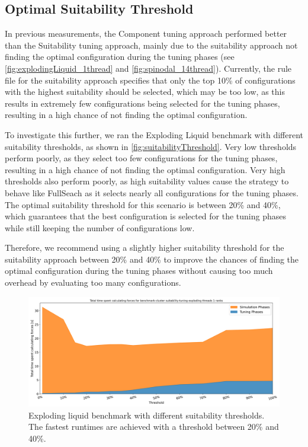 \subsection{Optimal Suitability Threshold}
\label{sec:suitabilityThreshold}

In previous measurements, the Component tuning approach performed better than the Suitability tuning approach, mainly due to the suitability approach not finding the optimal configuration during the tuning phases (see \autoref{fig:explodingLiquid_1thread} and \autoref{fig:spinodal_14thread}).
Currently, the rule file for the suitability approach specifies that only the top 10\% of configurations with the highest suitability should be selected, which may be too low, as this results in extremely few configurations being selected for the tuning phases, resulting in a high chance of not finding the optimal configuration.

To investigate this further, we ran the Exploding Liquid benchmark with different suitability thresholds, as shown in \autoref{fig:suitabilityThreshold}. Very low thresholds perform poorly, as they select too few configurations for the tuning phases, resulting in a high chance of not finding the optimal configuration. Very high thresholds also perform poorly, as high suitability values cause the strategy to behave like FullSeach as it selects nearly all configurations for the tuning phases. The optimal suitability threshold for this scenario is between 20\% and 40\%, which guarantees that the best configuration is selected for the tuning phases while still keeping the number of configurations low.


Therefore, we recommend using a slightly higher suitability threshold for the suitability approach between 20\% and 40\% to improve the chances of finding the optimal configuration during the tuning phases without causing too much overhead by evaluating too many configurations.


\begin{figure}[H]
    \centering
    \includegraphics[width=\columnwidth]{figures/Benchmark/SuitabilitySearch/SuitabilityExploding_timings_threshold_benchmark-cluster_suitability-tuning-exploding_1.png}
    \caption[
        Impact of the suitability threshold on the simulation performance
    ]{Exploding liquid benchmark with different suitability thresholds. The fastest runtimes are achieved with a threshold between 20\% and 40\%.}
    \label{fig:suitabilityThreshold}
\end{figure}

